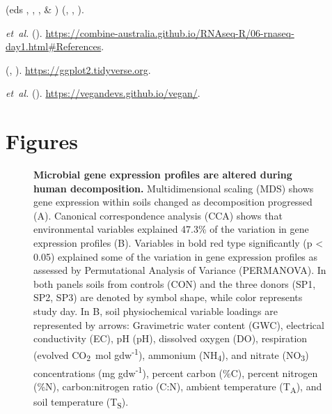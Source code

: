 \documentclass[
  sn-nature,
  lineno, referee]{sn-jnl}
\begin{document}
\begin{thebibliography}{10}
  \newblock {} (eds , , ,  \& ) \emph{}  (, , ).
  
   \emph{et~al.}
  \newblock {} ().
  \newblock \urlprefix\url{https://combine-australia.github.io/RNAseq-R/06-rnaseq-day1.html#References}.
  
  \newblock \emph{}  (, ).
  \newblock \urlprefix\url{https://ggplot2.tidyverse.org}.
  
   \emph{et~al.}
  \newblock \emph{}  ().
  \newblock \urlprefix\url{https://vegandevs.github.io/vegan/}.
  
  \end{thebibliography}
  

\newpage

\section{Figures}\label{figures}

\begin{figure}[!h]
\caption{{\bf Microbial gene expression profiles are altered during human decomposition.}
Multidimensional scaling (MDS) shows gene expression within soils changed as decomposition progressed (A). Canonical correspondence analysis (CCA) shows that environmental variables explained 47.3\% of the variation in gene expression profiles (B). Variables in bold red type significantly (p < 0.05) explained some of the variation in gene expression profiles as assessed by Permutational Analysis of Variance (PERMANOVA). In both panels soils from controls (CON) and the three donors (SP1, SP2, SP3) are denoted by symbol shape, while color represents study day. In B, soil physiochemical variable loadings are represented by arrows: Gravimetric water content (GWC), electrical conductivity (EC), pH (pH), dissolved oxygen (DO), respiration (evolved CO\textsubscript{2}\ \textmu mol gdw\textsuperscript{-1}), ammonium (NH\textsubscript{4}), and nitrate (NO\textsubscript{3}) concentrations (mg gdw\textsuperscript{-1}), percent carbon (\%C), percent nitrogen (\%N), carbon:nitrogen ratio (C:N), ambient temperature (T\textsubscript{A}), and soil temperature (T\textsubscript{S}).}
\label{fig-mds}
\end{figure}
\end{document}
